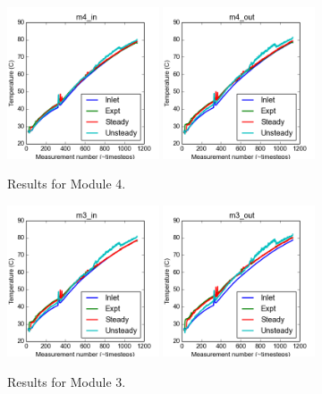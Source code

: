 \documentclass{article}
\begin{document}
\clearpage
\begin{figure}[!ht]
\centering
\includegraphics[width=0.4\textwidth]{../../data/ICSolar/images/Feb27_m4_in_compare.png}\hspace{0.05\textwidth}
\includegraphics[width=0.4\textwidth]{../../data/ICSolar/images/Feb27_m4_out_compare.png}\hspace{0.05\textwidth}\\
\caption{Results for Module 4.}\end{figure}
\begin{figure}[!ht]
\centering
\includegraphics[width=0.4\textwidth]{../../data/ICSolar/images/Feb27_m3_in_compare.png}\hspace{0.05\textwidth}
\includegraphics[width=0.4\textwidth]{../../data/ICSolar/images/Feb27_m3_out_compare.png}\hspace{0.05\textwidth}\\
\caption{Results for Module 3.}\end{figure}
\end{document}
